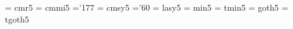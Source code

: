 \def\@ftfam#1{\fam\csname fm\string#1\endcsname\csname ft\string#1\endcsname}

\def\@nomath#1{\ifmmode \@warning{\string#1\space in math mode.}\fi}
\def\@nomathbold{\ifmmode \@warning{\string\mathbold\space in math mode.}\fi}


\def\@height{height}
\def\@depth{depth}
\def\@width{width}

\def\@magscale#1{ scaled \magstep #1}
\def\@halfmag{ scaled \magstephalf}
\def\@ptscale#1{ scaled #100}

%
%
%
\def\@setstrut{%
  \setbox\strutbox\hbox{\yoko%
    \vrule height.7\baselineskip depth.3\baselineskip width\z@}%
  \setbox\tstrutbox\hbox{\tate%
    \vrule height.5\baselineskip depth.5\baselineskip width\z@}%
  \setbox\zstrutbox\hbox{\tate%
    \vrule height.7\baselineskip depth.3\baselineskip width\z@}}



 \font\fivrm  = cmr5               %
 \font\fivmi  = cmmi5              %
    \skewchar\fivmi ='177          %
 \font\fivsy  = cmsy5              %
    \skewchar\fivsy ='60           %
 \font\fivly  = lasy5              %
\font\fivmin  = min5               %
\font\fivtmin = tmin5              %
\font\fivgt   = goth5              %
\font\fivtgt  = tgoth5             %
  

